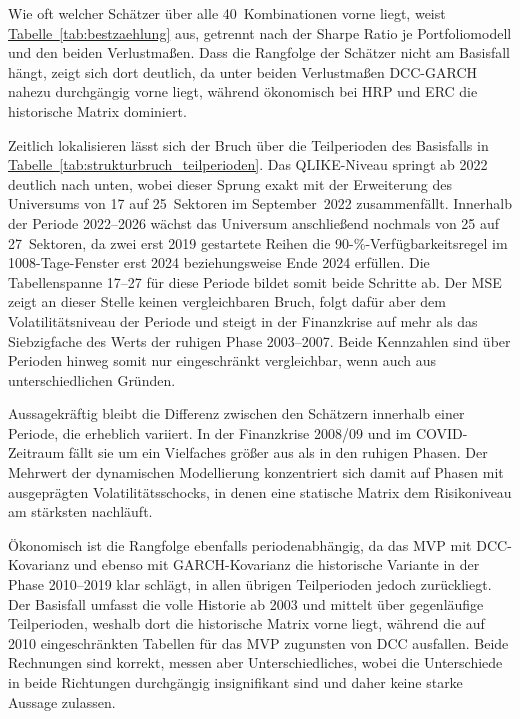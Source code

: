 \documentclass[12pt,a4paper]{article}
\begin{document}
Wie oft welcher Schätzer über alle 40~Kombinationen vorne liegt, weist \hyperref[tab:bestzaehlung]{Tabelle~\ref*{tab:bestzaehlung}} aus, getrennt nach der Sharpe Ratio je Portfoliomodell und den beiden Verlustmaßen.
Dass die Rangfolge der Schätzer nicht am Basisfall hängt, zeigt sich dort deutlich, da unter beiden Verlustmaßen DCC-GARCH nahezu durchgängig vorne liegt, während ökonomisch bei HRP und ERC die historische Matrix dominiert.



Zeitlich lokalisieren lässt sich der Bruch über die Teilperioden des Basisfalls in \hyperref[tab:strukturbruch_teilperioden]{Tabelle~\ref*{tab:strukturbruch_teilperioden}}.
Das QLIKE-Niveau springt ab 2022 deutlich nach unten, wobei dieser Sprung exakt mit der Erweiterung des Universums von 17 auf 25~Sektoren im September~2022 zusammenfällt.
Innerhalb der Periode 2022--2026 wächst das Universum anschließend nochmals von 25 auf 27~Sektoren, da zwei erst 2019 gestartete Reihen die 90-\%-Verfügbarkeitsregel im 1008-Tage-Fenster erst 2024 beziehungsweise Ende 2024 erfüllen.
Die Tabellenspanne 17--27 für diese Periode bildet somit beide Schritte ab.
Der MSE zeigt an dieser Stelle keinen vergleichbaren Bruch, folgt dafür aber dem Volatilitätsniveau der Periode und steigt in der Finanzkrise auf mehr als das Siebzigfache des Werts der ruhigen Phase 2003--2007.
Beide Kennzahlen sind über Perioden hinweg somit nur eingeschränkt vergleichbar, wenn auch aus unterschiedlichen Gründen.



Aussagekräftig bleibt die Differenz zwischen den Schätzern innerhalb einer Periode, die erheblich variiert.
In der Finanzkrise 2008/09 und im COVID-Zeitraum fällt sie um ein Vielfaches größer aus als in den ruhigen Phasen.
Der Mehrwert der dynamischen Modellierung konzentriert sich damit auf Phasen mit ausgeprägten Volatilitätsschocks, in denen eine statische Matrix dem Risikoniveau am stärksten nachläuft.

Ökonomisch ist die Rangfolge ebenfalls periodenabhängig, da das MVP mit DCC-Kovarianz und ebenso mit GARCH-Kovarianz die historische Variante in der Phase 2010--2019 klar schlägt, in allen übrigen Teilperioden jedoch zurückliegt.
Der Basisfall umfasst die volle Historie ab 2003 und mittelt über gegenläufige Teilperioden, weshalb dort die historische Matrix vorne liegt, während die auf 2010 eingeschränkten Tabellen für das MVP zugunsten von DCC ausfallen.
Beide Rechnungen sind korrekt, messen aber Unterschiedliches, wobei die Unterschiede in beide Richtungen durchgängig insignifikant sind und daher keine starke Aussage zulassen.
\end{document}
